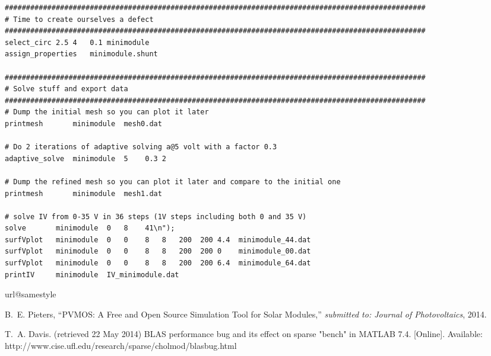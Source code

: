 \documentclass[noshowpacs,preprintnumbers,amsmath,amssymb, letter]{revtex4}
\begin{document}
\begin{small}
\begin{verbatim}
###################################################################################################
# Time to create ourselves a defect
###################################################################################################
select_circ 2.5 4   0.1 minimodule
assign_properties   minimodule.shunt

###################################################################################################
# Solve stuff and export data
###################################################################################################
# Dump the initial mesh so you can plot it later
printmesh       minimodule  mesh0.dat

# Do 2 iterations of adaptive solving a@5 volt with a factor 0.3
adaptive_solve  minimodule  5    0.3 2

# Dump the refined mesh so you can plot it later and compare to the initial one
printmesh       minimodule  mesh1.dat

# solve IV from 0-35 V in 36 steps (1V steps including both 0 and 35 V)
solve       minimodule  0   8    41\n");
surfVplot   minimodule  0   0    8   8   200  200 4.4  minimodule_44.dat
surfVplot   minimodule  0   0    8   8   200  200 0    minimodule_00.dat
surfVplot   minimodule  0   0    8   8   200  200 6.4  minimodule_64.dat
printIV     minimodule  IV_minimodule.dat
\end{verbatim}
\end{small}
\begin{thebibliography}{10}
\providecommand{\url}[1]{#1}
\csname url@samestyle\endcsname
\providecommand{\newblock}{\relax}
\providecommand{\bibinfo}[2]{#2}
\providecommand{\BIBentrySTDinterwordspacing}{\spaceskip=0pt\relax}
\providecommand{\BIBentryALTinterwordstretchfactor}{4}
\providecommand{\BIBentryALTinterwordspacing}{\spaceskip=\fontdimen2\font plus
\BIBentryALTinterwordstretchfactor\fontdimen3\font minus
  \fontdimen4\font\relax}
\providecommand{\BIBforeignlanguage}[2]{{%
\expandafter\ifx\csname l@#1\endcsname\relax
\typeout{** WARNING: IEEEtran.bst: No hyphenation pattern has been}%
\typeout{** loaded for the language `#1'. Using the pattern for}%
\typeout{** the default language instead.}%
\else
\language=\csname l@#1\endcsname
\fi
#2}}
\providecommand{\BIBdecl}{\relax}
\BIBdecl


B.~E. Pieters, ``{PVMOS: A Free and Open Source Simulation Tool for Solar Modules},'' \emph{submitted to: Journal of Photovoltaics}, 2014.

T.~A. Davis. (retrieved 22 May 2014) {BLAS performance bug and its effect on
  sparse "bench" in MATLAB 7.4}. [Online]. Available:
  \url{http://www.cise.ufl.edu/research/sparse/cholmod/blasbug.html}
\end{thebibliography}
\end{document}
